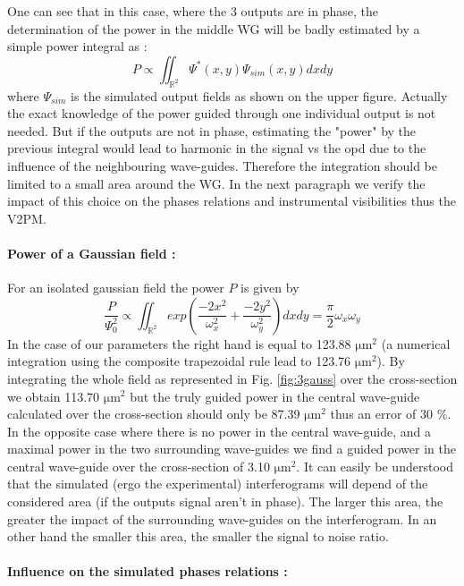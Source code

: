 One can see that in this case, where the 3 outputs are in phase, the
determination of the power in the middle WG will be badly estimated by
a simple power integral as : 
\begin{equation} \label{Eq:powerint}
P \propto \iint_{\mathbb{R}^2}
  \Psi^*(x,y)\Psi_{sim}(x,y) dxdy
  \end{equation}
  where $\Psi_{sim}$ is the simulated
output fields as shown on the upper figure. Actually the exact knowledge of the power guided through one individual output is not needed. But if the outputs are not in phase, estimating the "power" by the previous integral would lead to harmonic in the signal vs the \gls{opd} due to the influence of the neighbouring wave-guides. Therefore the integration
should be limited to a small area around the WG. In the next
paragraph we verify the impact of this choice on the phases
relations and instrumental visibilities thus the \gls{V2PM}.

\paragraph{Power of a Gaussian field :}

For an isolated gaussian field the power $P$ is given by \[ \frac{P}{\Psi_0^2} \propto \iint_{\mathbb{R}^2} exp\left( \frac{-2x^2}{\omega_x^2} + \frac{-2y^2}{\omega_y^2} \right) dx dy = \frac{\pi}{2} \omega_x \omega_y\]
In the case of our parameters the right hand is equal to 123.88
$\si{\micro\meter}^2$  (a numerical
integration using the composite trapezoidal rule lead to 123.76 $\si{\micro\meter}^2$). By integrating the whole field as represented
in Fig. \ref{fig:3gauss} over the cross-section we obtain 113.70 $\si{\micro\meter}^2$ but
the truly guided power in the central wave-guide calculated over the
cross-section should only be 87.39 $\si{\micro\meter}^2$ thus an error
of 30 \%. \\
In the opposite case where there is no power in the central
wave-guide, and a maximal power in the two surrounding wave-guides we
find a  guided power in the central wave-guide over the
cross-section of 3.10 $\si{\micro\meter}^2$. It can easily be
understood that the simulated (ergo the experimental) interferograms
will depend of the considered area (if the outputs signal aren't in phase). The larger this area, the greater the impact of the surrounding wave-guides on the interferogram. In an other hand the smaller this area, the smaller the signal to noise ratio.

\paragraph{Influence on the simulated phases relations :}

